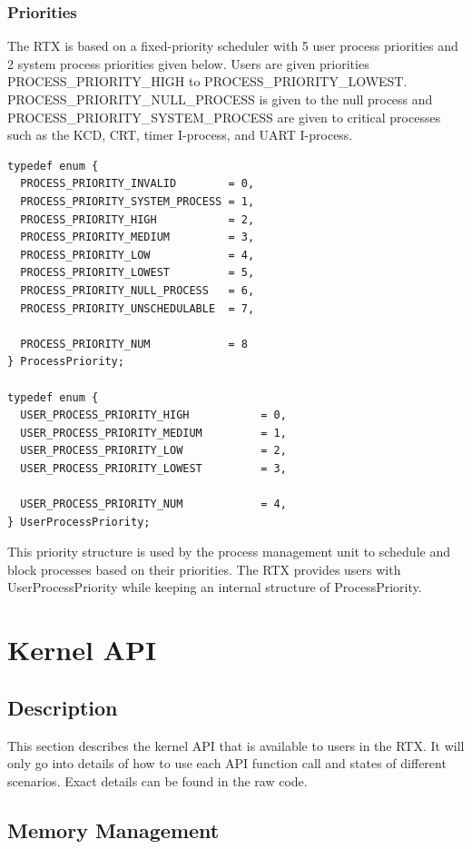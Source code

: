\documentclass[12pt]{report}
\begin{document}
\subsection{Priorities}
The RTX is based on a fixed-priority scheduler with 5 user process priorities and 2 system process priorities given below. Users are given priorities PROCESS\_PRIORITY\_HIGH to PROCESS\_PRIORITY\_LOWEST. PROCESS\_PRIORITY\_NULL\_PROCESS is given to the null process and PROCESS\_PRIORITY\_SYSTEM\_PROCESS are given to critical processes such as the KCD, CRT, timer I-process, and UART I-process.

\begin{lstlisting}
typedef enum {
  PROCESS_PRIORITY_INVALID        = 0,
  PROCESS_PRIORITY_SYSTEM_PROCESS = 1,
  PROCESS_PRIORITY_HIGH           = 2,
  PROCESS_PRIORITY_MEDIUM         = 3,
  PROCESS_PRIORITY_LOW            = 4,
  PROCESS_PRIORITY_LOWEST         = 5,
  PROCESS_PRIORITY_NULL_PROCESS   = 6,
  PROCESS_PRIORITY_UNSCHEDULABLE  = 7,

  PROCESS_PRIORITY_NUM            = 8
} ProcessPriority;

typedef enum {
  USER_PROCESS_PRIORITY_HIGH           = 0,
  USER_PROCESS_PRIORITY_MEDIUM         = 1,
  USER_PROCESS_PRIORITY_LOW            = 2,
  USER_PROCESS_PRIORITY_LOWEST         = 3,

  USER_PROCESS_PRIORITY_NUM            = 4,
} UserProcessPriority;
\end{lstlisting}

This priority structure is used by the process management unit to schedule and block processes based on their priorities. The RTX provides users with UserProcessPriority while keeping an internal structure of ProcessPriority.

\chapter{Kernel API}
\section{Description}
This section describes the kernel API that is available to users in the RTX. It will only go into details of how to use each API function call and states of different scenarios. Exact details can be found in the raw code.

\section{Memory Management}
\end{document}
